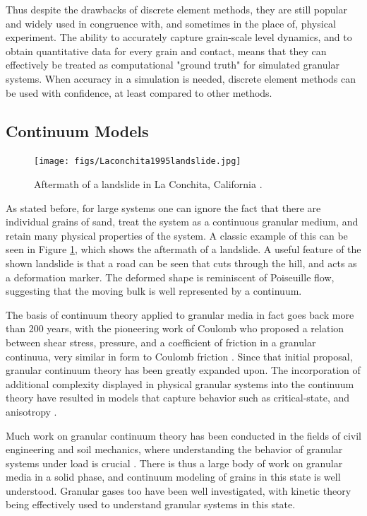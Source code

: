 Thus despite the drawbacks of discrete element methods, they are still popular and widely used in congruence with, and sometimes in the place of, physical experiment. The ability to accurately capture grain-scale level dynamics, and to obtain quantitative data for every grain and contact, means that they can effectively be treated as computational "ground truth" for simulated granular systems. When accuracy in a simulation is needed, discrete element methods can be used with confidence, at least compared to other methods.

\subsection{Continuum Models}
\begin{figure}[htp] 
    \centering
    \texttt{[image: figs/Laconchita1995landslide.jpg]}
    \caption{Aftermath of a landslide in La Conchita, California \cite{Laconchita}.}
    \label{landslide}
\end{figure}

As stated before, for large %
systems one can ignore the fact that there are individual grains of sand, treat the system as a continuous granular medium, and retain many physical properties of the system. A classic example of this can be seen in Figure \ref{landslide}, which shows the aftermath of a landslide. A useful feature of the shown landslide is that a road can be seen that cuts through the hill, and acts as a deformation marker. The deformed shape is reminiscent of Poiseuille flow, suggesting that the moving bulk is well represented by a continuum.

The basis of continuum theory applied to granular media in fact goes back more than 200 years, with the pioneering work of Coulomb who proposed a relation between shear stress, pressure, and a coefficient of friction in a granular continuua, very similar in form to Coulomb friction \cite{Coulomb}. Since that initial proposal, granular continuum theory has been greatly expanded upon. The incorporation of additional complexity displayed in physical granular systems into the continuum theory have resulted in models that capture behavior such as critical-state, and anisotropy \cite{Schofield:1968:Critical}\cite{Dafalias:2004:Sand}.

Much work on granular continuum theory has been conducted in the fields of civil engineering and soil mechanics, where understanding the behavior of granular systems under load is crucial \cite{Roscoe:1958}. There is thus a large body of work on granular media in a solid phase, and continuum modeling of grains in this state is well understood. Granular gases too have been well investigated, with kinetic theory being effectively used to understand granular systems in this state.

